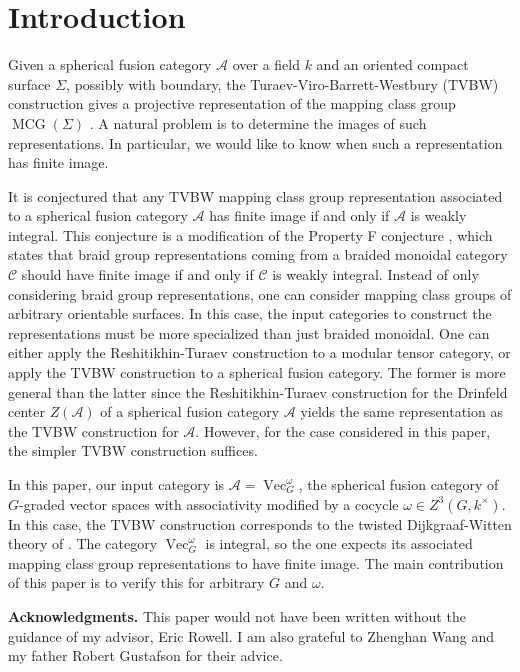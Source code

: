 \documentclass{amsart}
\DeclareMathOperator{\MCG}{MCG}
\DeclareMathOperator{\Vect}{Vec}
\newcommand{\Si}{\Sigma}
\begin{document}
\section{Introduction}
Given a spherical fusion category $\mathcal A$ over a field $k$ and an oriented compact surface $\Si$, possibly with boundary, the Turaev-Viro-Barrett-Westbury (TVBW) construction gives a projective representation of the mapping class group $\MCG(\Si)$ \cite{hep-th/9311155, TURAEV1992865}.  A natural problem is to determine the images of such representations.  In particular, we would like to know when such a representation has finite image.

It is conjectured that any TVBW mapping class group representation associated to a spherical fusion category $\mathcal A$ has finite image if and only if  $\mathcal A$ is weakly integral.  This conjecture is a modification of the Property F conjecture \cite{erw, nr}, which states that braid group representations coming from a braided monoidal category $\mathcal C$ should have finite image if and only if $\mathcal C$ is weakly integral. Instead of only considering braid group representations, one can consider mapping class groups of arbitrary orientable surfaces.  In this case, the input categories to construct the representations must be more specialized than just braided monoidal.  One can either apply the Reshitikhin-Turaev construction to a modular tensor category, or apply the TVBW construction to a spherical fusion category.  The former is more general than the latter since the Reshitikhin-Turaev construction for the Drinfeld center $Z(\mathcal A)$ of a spherical fusion category $\mathcal A$ yields the same representation as the TVBW construction for $\mathcal A$.  However, for the case considered in this paper, the simpler TVBW construction suffices.

In this paper, our input category is  $\mathcal A = \Vect_G^\omega$, the spherical fusion category of $G$-graded vector spaces with associativity modified by a cocycle $\omega \in Z^3(G, k^\times)$.  In this case, the TVBW construction corresponds to the twisted Dijkgraaf-Witten theory of \cite{dijkgraaf1990}.  The category $\Vect_G^\omega$ is integral, so the one expects its associated mapping class group representations to have finite image.  The main contribution of this paper is to verify this for arbitrary $G$ and $\omega$.

\textbf{Acknowledgments.}  This paper would not have been written without the guidance of my advisor, Eric Rowell.  I am also grateful to Zhenghan Wang and my father Robert Gustafson for their advice.
\end{document}
